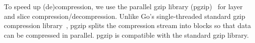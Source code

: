 %
To speed up (de)compression, we use the parallel gzip library (pgzip)~\cite{pgzip}
for layer and slice compression/decompression.
%
Unlike Go's single-threaded standard gzip compression library~\cite{gogzip},
pgzip splits the compression stream into blocks so that data can be compressed in
parallel. pgzip is compatible with the standard gzip library.


